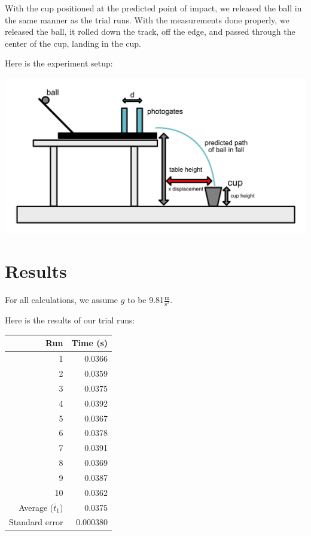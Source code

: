 \documentclass[12pt]{article}
\begin{document}
With the cup positioned at the predicted point of impact, we released the ball in the same manner as the trial runs. With the measurements done properly, we released the ball, it rolled down the track, off the edge, and passed through the center of the cup, landing in the cup.

Here is the experiment setup:

\begin{center}
\includegraphics[width=6in]{./projectilesetup.png}
\end{center}
\section{Results}
\label{sec:orgefb2762}

For all calculations, we assume \(g\) to be 9.81\(\frac{\text{m}}{\text{s}^{2}}\).

Here is the results of our trial runs:
\begin{center}
\begin{tabular}{r|r}
\hline
Run & Time (s)\\
\hline
1 & 0.0366\\
2 & 0.0359\\
3 & 0.0375\\
4 & 0.0392\\
5 & 0.0367\\
6 & 0.0378\\
7 & 0.0391\\
8 & 0.0369\\
9 & 0.0387\\
10 & 0.0362\\
\hline
Average (\(\bar{t}_{1}\)) & 0.0375\\
Standard error & 0.000380\\
\end{tabular}
\end{center}
\end{document}
